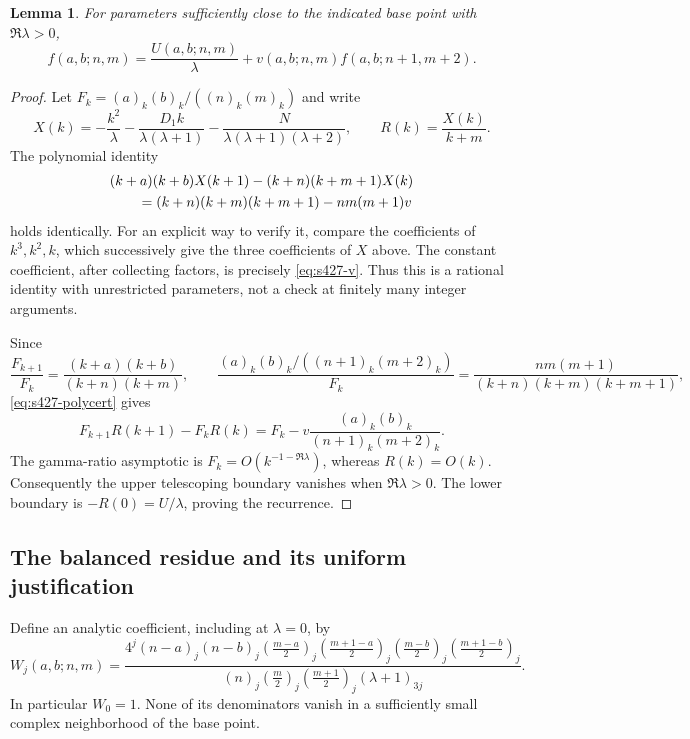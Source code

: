 \documentclass[11pt,a4paper]{article}
\newtheorem{lemma}[theorem]{Lemma}
\theoremstyle{remark}\newtheorem{remark}[theorem]{Remark}
\numberwithin{equation}{section}
\begin{document}
\begin{lemma}\label{lem:s427-recurrence}
For parameters sufficiently close to the indicated base point with
$\Re\lambda>0$,
\begin{equation}\label{eq:s427-recurrence}
 f(a,b;n,m)=\frac{U(a,b;n,m)}{\lambda}
       +v(a,b;n,m)f(a,b;n+1,m+2).
\end{equation}
\end{lemma}
\begin{proof}
Let $F_k=(a)_k(b)_k/((n)_k(m)_k)$ and write
\[
 X(k)=-\frac{k^2}{\lambda}
 -\frac{D_1 k}{\lambda(\lambda+1)}
 -\frac{N}{\lambda(\lambda+1)(\lambda+2)},\qquad
 R(k)=\frac{X(k)}{k+m}.
\]
The polynomial identity
\begin{align}
 &(k+a)(k+b)X(k+1)-(k+n)(k+m+1)X(k)\notag\\
 &\qquad=(k+n)(k+m)(k+m+1)-nm(m+1)v
 \label{eq:s427-polycert}
\end{align}
holds identically. For an explicit way to verify it, compare the
coefficients of $k^3,k^2,k$, which successively give the three
coefficients of $X$ above. The constant coefficient, after collecting
factors, is precisely \eqref{eq:s427-v}. Thus this is a rational
identity with unrestricted parameters, not a check at finitely many
integer arguments.

Since
\[
 \frac{F_{k+1}}{F_k}=\frac{(k+a)(k+b)}{(k+n)(k+m)},\qquad
 \frac{(a)_k(b)_k/((n+1)_k(m+2)_k)}{F_k}
 =\frac{nm(m+1)}{(k+n)(k+m)(k+m+1)},
\]
\eqref{eq:s427-polycert} gives
\[
 F_{k+1}R(k+1)-F_kR(k)
 =F_k-v\frac{(a)_k(b)_k}{(n+1)_k(m+2)_k}.
\]
The gamma-ratio asymptotic is $F_k=O(k^{-1-\Re\lambda})$,
whereas $R(k)=O(k)$. Consequently the upper telescoping boundary
vanishes when $\Re\lambda>0$. The lower boundary is
$-R(0)=U/\lambda$, proving the recurrence.
\end{proof}

\subsection{The balanced residue and its uniform justification}

Define an analytic coefficient, including at $\lambda=0$, by
\begin{equation}\label{eq:s427-W}
 W_j(a,b;n,m)=
 \frac{4^j(n-a)_j(n-b)_j
 (\frac{m-a}{2})_j(\frac{m+1-a}{2})_j
 (\frac{m-b}{2})_j(\frac{m+1-b}{2})_j}
 {(n)_j(\frac m2)_j(\frac{m+1}{2})_j(\lambda+1)_{3j}}.
\end{equation}
In particular $W_0=1$. None of its denominators vanish in a sufficiently
small complex neighborhood of the base point.
\end{document}
